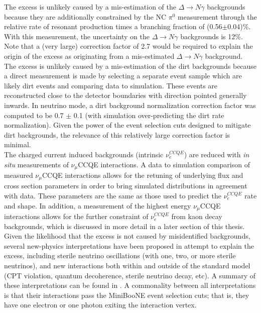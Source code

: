 The excess is unlikely caused by a mis-estimation of the $\Delta\rightarrow N\gamma$ backgrounds because they are additionally constrained by the NC $\pi^0$ measurement through the relative rate of resonant production times a branching fraction of (0.56$\pm$0.04)\%. With this measurement, the uncertainty on the $\Delta\rightarrow N\gamma$ backgrounds is 12\%. Note that a (very large) correction factor of 2.7 would be required to explain the origin of the excess as originating from a mis-estimated $\Delta \rightarrow N\gamma$ background.\\

The excess is unlikely caused by a mis-estimation of the dirt backgrounds because a direct measurement is made by selecting a separate event sample which are likely dirt events and comparing data to simulation. These events are reconstructed close to the detector boundaries with direction pointed generally inwards. In neutrino mode, a dirt background normalization correction factor was computed to be 0.7 $\pm$ 0.1 (with simulation over-predicting the dirt rate normalization). Given the power of the event selection cuts designed to mitigate dirt backgrounds, the relevance of this relatively large correction factor is minimal.\\

The charged current induced backgrounds (intrinsic $\nu_e^{CCQE}$) are reduced with \textit{in situ} measurements of $\nu_\mu$CCQE interactions. A data to simulation comparison of measured $\nu_\mu$CCQE interactions allows for the retuning of underlying flux and cross section parameters in order to bring simulated distributions in agreement with data. These parameters are the same as those used to predict the $\nu_e^{CCQE}$ rate and shape. In addition, a measurement of the highest energy $\nu_\mu$CCQE interactions allows for the further constraint of $\nu_e^{CCQE}$ from kaon decay backgrounds, which is discussed in more detail in a later section of this thesis.\\

Given the likelihood that the excess is not caused by misidentified backgrounds, several new-physics interpretations have been proposed in attempt to explain the excess, including sterile neutrino oscillations (with one, two, or more sterile neutrinos), and new interactions both within and outside of the standard model (CPT violation, quantum decoherence, sterile neutrino decay, etc). A summary of these interpretations can be found in \cite{MBLEESourcesOverview}. A commonality between all interpretations is that their interactions pass the MiniBooNE event selection cuts; that is, they have one electron or one photon exiting the interaction vertex.

